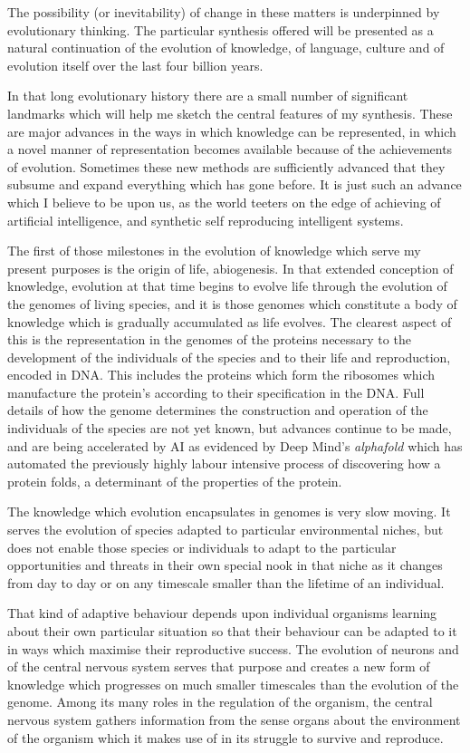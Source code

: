 \documentclass[10pt,titlepage]{book}
\begin{document}
The possibility (or inevitability) of change in these matters is underpinned by evolutionary thinking.
The particular synthesis offered will be presented as a natural continuation of the evolution of knowledge, of language, culture and of evolution itself over the last four billion years.

In that long evolutionary history there are a small number of significant landmarks which will help me sketch the central features of my synthesis.
These are major advances in the ways in which knowledge can be represented, in which a novel manner of representation becomes available  because of the achievements of evolution.
Sometimes these new methods are sufficiently advanced that they subsume and expand everything which has gone before.
It is just such an advance which I believe to be upon us, as the world teeters on the edge of achieving of artificial intelligence, and synthetic self reproducing intelligent systems.

The first of those milestones in the evolution of knowledge which serve my present purposes is the origin of life, abiogenesis.
In that extended conception of knowledge, evolution at that time begins to evolve life through the evolution of the genomes of living species, and it is those genomes which constitute a body of knowledge which is gradually accumulated as life evolves.
The clearest aspect of this is the representation in the genomes of the proteins necessary to the development of the individuals of the species and to their life and reproduction, encoded in DNA.
This includes the proteins which form the ribosomes which manufacture the protein's according to their specification in the DNA.
Full details of how the genome determines the construction and operation of the individuals of the species are not yet known, but advances continue to be made, and are being accelerated by AI as evidenced by Deep Mind's \emph{alphafold} which has automated the previously highly labour intensive process of discovering how a protein folds, a determinant of the properties of the protein.

The knowledge which evolution encapsulates in genomes is very slow moving.
It serves the evolution of species adapted to particular environmental niches, but does not enable those species or individuals to adapt to the particular opportunities and threats in their own special nook in that niche as it changes from day to day or on any timescale smaller than the lifetime of an individual.

That kind of adaptive behaviour depends upon individual organisms learning about their own particular situation so that their behaviour can be adapted to it in ways which maximise their reproductive success.
The evolution of neurons and of the central nervous system serves that purpose and creates a new form of knowledge which progresses on much smaller timescales than the evolution of the genome.
Among its many roles in the regulation of the organism, the central nervous system gathers information from the sense organs about the environment of the organism which it makes use of in its struggle to survive and reproduce.
\end{document}
